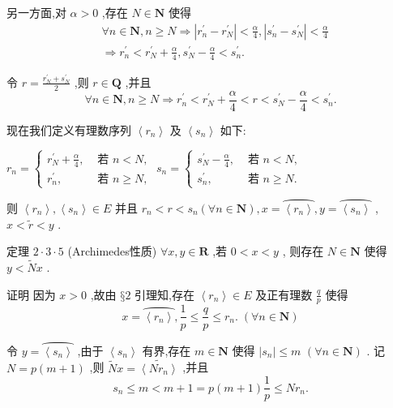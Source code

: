 另一方面,对 $\alpha  > 0$ ,存在 $N \in  \mathbf{N}$ 使得
\begin{align*}
	&\forall n \in  \mathbf{N},n \geq  N \Rightarrow  \left| {{r}_{n}^{\prime } - {r}_{N}^{\prime }}\right|  < \frac{\alpha }{4},\left| {{s}_{n}^{\prime } - {s}_{N}^{\prime }}\right|  < \frac{\alpha }{4}\\
	&\Rightarrow  {r}_{n}^{\prime } < {r}_{N}^{\prime } + \frac{\alpha }{4},{s}_{N}^{\prime } - \frac{\alpha }{4} < {s}_{n}^{\prime }.
\end{align*}

令 $r = \frac{{r}_{N}^{\prime } + {s}_{N}^{\prime }}{2}$ ,则 $r \in  \mathbf{Q}$ ,并且
$$\forall n \in  \mathbf{N},n \geq  N \Rightarrow  {r}_{n}^{\prime } < {r}_{N}^{\prime } + \frac{\alpha }{4} < r < {s}_{N}^{\prime } - \frac{\alpha }{4} < {s}_{n}^{\prime }.$$

现在我们定义有理数序列 $\left\langle  {r}_{n}\right\rangle$ 及 $\left\langle  {s}_{n}\right\rangle$ 如下:

${r}_{n} = \left\{  {\begin{array}{ll} {r}_{N}^{\prime } + \frac{\alpha }{4}, & \text{ 若 }n < N, \\  {r}_{n}^{\prime }, & \text{ 若 }n \geq  N, \end{array}\;{s}_{n} = \left\{  \begin{array}{ll} {s}_{N}^{\prime } - \frac{\alpha }{4}, & \text{ 若 }n < N, \\  {s}_{n}^{\prime }, & \text{ 若 }n \geq  N. \end{array}\right. }\right.$

则 $\left\langle  {r}_{n}\right\rangle  ,\left\langle  {s}_{n}\right\rangle   \in  E$ 并且 ${r}_{n} < r < {s}_{n}\left( {\forall n \in  \mathbf{N}}\right) ,x = \overset{⏜}{\left\langle  {r}_{n}\right\rangle  },y = \overset{⏜}{\left\langle  {s}_{n}\right\rangle  }$ , $x < \widetilde{r} < y$ .

定理 $2 \cdot  3 \cdot  5$ (Archimedes性质) $\forall x,y \in  \mathbf{R}$ ,若 $0 < x < y$ , 则存在 $N \in  \mathbf{N}$ 使得 $y < \widetilde{N}x$ .

证明 因为 $x > 0$ ,故由 $§2$ 引理知,存在 $\left\langle  {r}_{n}\right\rangle   \in  E$ 及正有理数 $\frac{q}{p}$ 使得
$$x = \overset{⏜}{\left\langle  {r}_{n}\right\rangle  },\frac{1}{p} \leq  \frac{q}{p} \leq  {r}_{n}.\;\left( {\forall n \in  \mathbf{N}}\right)$$

令 $y = \overset{⏜}{\left\langle  {s}_{n}\right\rangle  }$ ,由于 $\left\langle  {s}_{n}\right\rangle$ 有界,存在 $m \in  \mathbf{N}$ 使得 $\left| {s}_{n}\right|  \leq  m$  $\left( {\forall n \in  \mathbf{N}}\right)$ . 记 $N = p\left( {m + 1}\right)$ ,则 $\widetilde{N}x = \widetilde{\left\langle  N{r}_{n}\right\rangle  }$ ,并且
$${s}_{n} \leq  m < m + 1 = p\left( {m + 1}\right) \frac{1}{p} \leq  N{r}_{n}.$$

